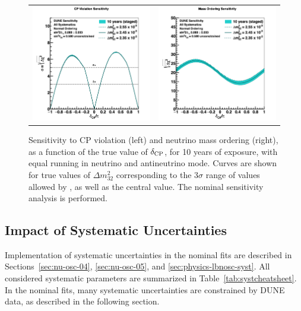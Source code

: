 \begin{figure}[h!]
    \centering
    \begin{tabular}{cc}
		\includegraphics[width=0.475\linewidth]{graphics/cpv_varydmsq_2019_v4.png} &
		\includegraphics[width=0.475\linewidth]{graphics/mh_varydmsq_2019_v4.png}
	\end{tabular}
	\caption[Sensitivity to CP violation and neutrino mass ordering, as a function of $\deltacp$]{Sensitivity to CP violation (left) and neutrino mass ordering (right), as a function of the true value of $\deltacp$, for 10 years of exposure, with equal running in neutrino and antineutrino mode. Curves are shown for true values of $\Delta m^2_{32}$ corresponding to the 3$\sigma$ range of values allowed by , as well as the  central value. The nominal sensitivity analysis is performed.}
    \label{fig:dmsqvar}
\end{figure}

\subsection{Impact of Systematic Uncertainties}
\label{sec:physics-lbnosc-systresults}

Implementation of systematic uncertainties in the nominal fits are described in Sections~\ref{sec:nu-osc-04}, \ref{sec:nu-osc-05}, and \ref{sec:physics-lbnosc-syst}. All considered systematic parameters are summarized in Table~\ref{tab:systcheatsheet}. %
In the nominal fits, many systematic uncertainties are constrained by DUNE data, as described in the following section.

